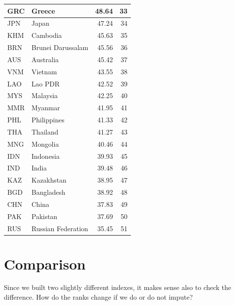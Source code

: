 \documentclass[
]{book}
\begin{document}
\begin{tabular}{l|l|r|r}
GRC & Greece & 48.64 & 33\\
\hline
JPN & Japan & 47.24 & 34\\
\hline
KHM & Cambodia & 45.63 & 35\\
\hline
BRN & Brunei Darussalam & 45.56 & 36\\
\hline
AUS & Australia & 45.42 & 37\\
\hline
VNM & Vietnam & 43.55 & 38\\
\hline
LAO & Lao PDR & 42.52 & 39\\
\hline
MYS & Malaysia & 42.25 & 40\\
\hline
MMR & Myanmar & 41.95 & 41\\
\hline
PHL & Philippines & 41.33 & 42\\
\hline
THA & Thailand & 41.27 & 43\\
\hline
MNG & Mongolia & 40.46 & 44\\
\hline
IDN & Indonesia & 39.93 & 45\\
\hline
IND & India & 39.48 & 46\\
\hline
KAZ & Kazakhstan & 38.95 & 47\\
\hline
BGD & Bangladesh & 38.92 & 48\\
\hline
CHN & China & 37.83 & 49\\
\hline
PAK & Pakistan & 37.69 & 50\\
\hline
RUS & Russian Federation & 35.45 & 51\\
\hline
\end{tabular}

\hypertarget{comparison}{%
\section{Comparison}\label{comparison}}

Since we built two slightly different indexes, it makes sense also to check the difference. How do the ranks change if we do or do not impute?
\end{document}
